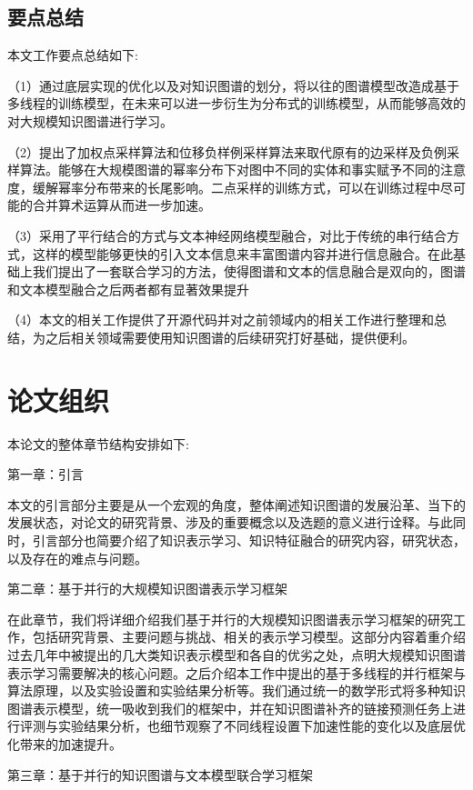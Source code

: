 \subsection{要点总结}

  本文工作要点总结如下:

  （1）通过底层实现的优化以及对知识图谱的划分，将以往的图谱模型改造成基于多线程的训练模型，在未来可以进一步衍生为分布式的训练模型，从而能够高效的对大规模知识图谱进行学习。
  
  （2）提出了加权点采样算法和位移负样例采样算法来取代原有的边采样及负例采样算法。能够在大规模图谱的幂率分布下对图中不同的实体和事实赋予不同的注意度，缓解幂率分布带来的长尾影响。二点采样的训练方式，可以在训练过程中尽可能的合并算术运算从而进一步加速。
  
  （3）采用了平行结合的方式与文本神经网络模型融合，对比于传统的串行结合方式，这样的模型能够更快的引入文本信息来丰富图谱内容并进行信息融合。在此基础上我们提出了一套联合学习的方法，使得图谱和文本的信息融合是双向的，图谱和文本模型融合之后两者都有显著效果提升
  
  （4）本文的相关工作提供了开源代码并对之前领域内的相关工作进行整理和总结，为之后相关领域需要使用知识图谱的后续研究打好基础，提供便利。

\section{论文组织}

本论文的整体章节结构安排如下:

第一章：引言

本文的引言部分主要是从一个宏观的角度，整体阐述知识图谱的发展沿革、当下的发展状态，对论文的研究背景、涉及的重要概念以及选题的意义进行诠释。与此同时，引言部分也简要介绍了知识表示学习、知识特征融合的研究内容，研究状态，以及存在的难点与问题。

第二章：基于并行的大规模知识图谱表示学习框架

在此章节，我们将详细介绍我们基于并行的大规模知识图谱表示学习框架的研究工作，包括研究背景、主要问题与挑战、相关的表示学习模型。这部分内容着重介绍过去几年中被提出的几大类知识表示模型和各自的优劣之处，点明大规模知识图谱表示学习需要解决的核心问题。之后介绍本工作中提出的基于多线程的并行框架与算法原理，以及实验设置和实验结果分析等。我们通过统一的数学形式将多种知识图谱表示模型，统一吸收到我们的框架中，并在知识图谱补齐的链接预测任务上进行评测与实验结果分析，也细节观察了不同线程设置下加速性能的变化以及底层优化带来的加速提升。

第三章：基于并行的知识图谱与文本模型联合学习框架

